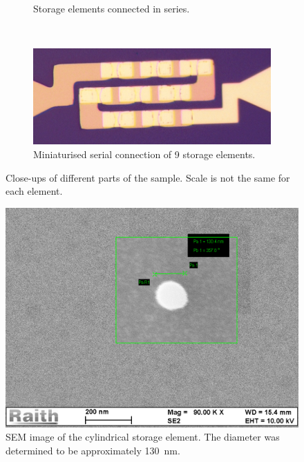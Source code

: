 \begin{figure}
\begin{subfigure}[b]{0.35\paperwidth}
        \caption{Storage elements connected in series.}
        \label{FabricationSampDetb}
    \end{subfigure}
    \\
    \begin{subfigure}[b]{0.5\paperwidth}
    	\centering
        \includegraphics[width=0.3\paperwidth]{img/04/fab_series_9_zoom.jpg}
        \caption{Miniaturised serial connection of 9 storage elements.}
        \label{FabricationSampDetc}
    \end{subfigure}
    \caption{Close-ups of different parts of the sample. Scale is not the same for each element.}
    \label{FabricationSampDet}
\end{figure}

    \begin{figure}[H]
        \centering
        \includegraphics[width=0.75\paperwidth]{img/04/PillarSEM.png}
        \caption{SEM image of the cylindrical storage element. The diameter was determined to be approximately \SI{130}{\nano\meter}.}
        \label{FabricationPillarSEM}
    \end{figure}
    
